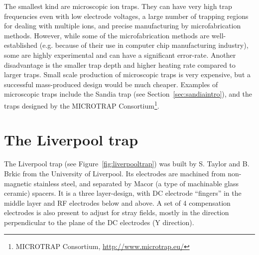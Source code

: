 The smallest kind are microscopic ion traps. They can have very high trap frequencies even with low electrode voltages, a large number of trapping regions for dealing with multiple ions, and precise manufacturing by microfabrication methods. However, while some of the microfabrication methods are well-established (e.g. because of their use in computer chip manufacturing industry), some are highly experimental and can have a significant error-rate. Another disadvantage is the smaller trap depth and higher heating rate compared to larger traps. Small scale production of microscopic traps is very expensive, but a successful mass-produced design would be much cheaper. Examples of microscopic traps include the Sandia trap (see Section~\ref{sec:sandiaintro}), and the traps designed by the MICROTRAP Consortium\footnote{MICROTRAP Consortium, \url{http://www.microtrap.eu/}}.

\section{The Liverpool trap}

The Liverpool trap (see Figure~\ref{fig:liverpooltrap}) was built by S. Taylor and B. Brkic from the University of Liverpool. Its electrodes are machined from non-magnetic stainless steel, and separated by Macor (a type of machinable glass ceramic) spacers. It is a three layer-design, with DC electrode ``fingers'' in the middle layer and RF electrodes below and above. A set of 4 compensation electrodes is also present to adjust for stray fields, mostly in the direction perpendicular to the plane of the DC electrodes (Y direction). 

